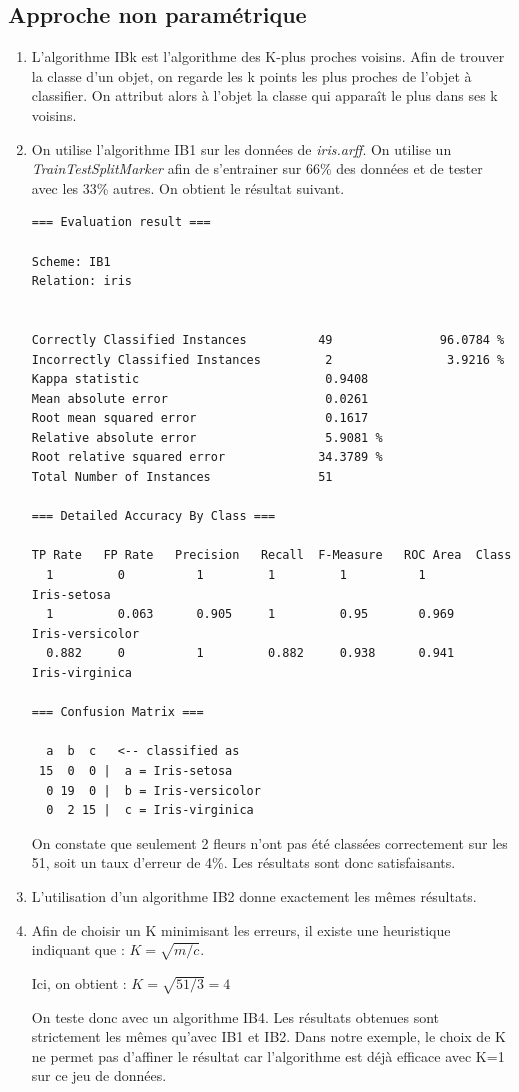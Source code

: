 \documentclass[a4paper]{article}
\begin{document}
\subsection{Approche non paramétrique}

\begin{enumerate}

\item L'algorithme IBk est l'algorithme des K-plus proches voisins. Afin de trouver la classe d'un objet, on regarde les k points les plus proches de l'objet à classifier. On attribut alors à l'objet la classe qui apparaît le plus dans ses k voisins.

\item On utilise l'algorithme IB1 sur les données de  \emph{iris.arff}. On utilise un \emph{TrainTestSplitMarker} afin de s'entrainer sur 66\% des données et de tester avec les 33\% autres. On obtient le résultat suivant.

\begin{lstlisting}[frame=single]
=== Evaluation result ===

Scheme: IB1
Relation: iris


Correctly Classified Instances          49               96.0784 %
Incorrectly Classified Instances         2                3.9216 %
Kappa statistic                          0.9408
Mean absolute error                      0.0261
Root mean squared error                  0.1617
Relative absolute error                  5.9081 %
Root relative squared error             34.3789 %
Total Number of Instances               51     

=== Detailed Accuracy By Class ===

TP Rate   FP Rate   Precision   Recall  F-Measure   ROC Area  Class
  1         0          1         1         1          1        Iris-setosa
  1         0.063      0.905     1         0.95       0.969    Iris-versicolor
  0.882     0          1         0.882     0.938      0.941    Iris-virginica

=== Confusion Matrix ===

  a  b  c   <-- classified as
 15  0  0 |  a = Iris-setosa
  0 19  0 |  b = Iris-versicolor
  0  2 15 |  c = Iris-virginica
\end{lstlisting}

On constate que seulement 2 fleurs n'ont pas été classées correctement sur les 51, soit un taux d'erreur de 4\%. Les résultats sont donc satisfaisants.

\item L'utilisation d'un algorithme IB2 donne exactement les mêmes résultats.

\item Afin de choisir un K minimisant les erreurs, il existe une heuristique indiquant que : $K =  \sqrt{m/c}$.


Ici, on obtient : $K = \sqrt{51/3} = 4$

On teste donc avec un algorithme IB4. Les résultats obtenues sont strictement les mêmes qu'avec IB1 et IB2.
Dans notre exemple, le choix de K ne permet pas d'affiner le résultat car l'algorithme est déjà efficace avec K=1 sur ce jeu de données.
\end{enumerate}
\end{document}
